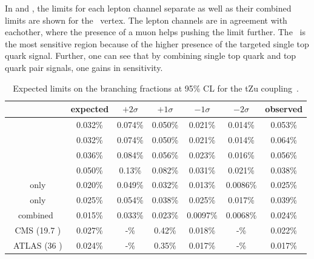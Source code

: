 In  and , the limits for each lepton channel separate as well as their combined limits are shown for the \Zut\ vertex. The lepton channels are in agreement with eachother, where the presence of a muon helps pushing the limit further. The \STSR\ is the most sensitive region because of the higher presence of the targeted single top quark signal. Further, one can see that by combining single top quark and top quark pair signals, one gains in sensitivity. 
\begin{table}[htbp]
	\centering
	\caption{Expected limits on the branching fractions at 95\% CL for the tZu coupling~\cite{Sirunyan:2017kkr,ATLAS-CONF-2017-070}.}
	\begin{tabular}{ccccccc}
		\toprule
		& expected & $+2\sigma$ & $+1\sigma$ & $-1\sigma$ & $-2\sigma$ & observed \\ 
		\midrule
		\mumumu\ & 0.032\% & 0.074\% & 0.050\% & 0.021\% & 0.014\% & 0.053\% \\ 
	
		\emumu\ & 0.032\% & 0.074\% & 0.050\% & 0.021\% & 0.014\% & 0.064\% \\ 
		
		\eemu\ & 0.036\% & 0.084\% & 0.056\% & 0.023\% & 0.016\% & 0.056\% \\ 
		
		\eee\ & 0.050\% & 0.13\% & 0.082\% & 0.031\% & 0.021\% & 0.038\% \B \\ 
		\hdashline
		\STSR\ only & 0.020\% & 0.049\% & 0.032\% & 0.013\% & 0.0086\% & 0.025\%  \T\\ 
		
		\TTSR\ only & 0.025\% & 0.054\% & 0.038\% & 0.025\% & 0.017\% & 0.039\% \B \\ 
		\hdashline
		combined & 0.015\% & 0.033\% & 0.023\% & 0.0097\% & 0.0068\% & 0.024\%  \T \B\\ 
		\hdashline
		8 \TeV\ CMS (19.7 \fbinv)   &0.027\% & -\%  & 0.42\% & 0.018\% & -\% & 0.022\%  \T\B\\
		\hdashline
		13 \TeV\ ATLAS (36 \fbinv)   & 0.024\% & -\% &   0.35\% & 0.017\%& -\% & 0.017\% \T\\
		
		\bottomrule
	\end{tabular} 
	\label{tab:ResultsTZU}
\end{table}
